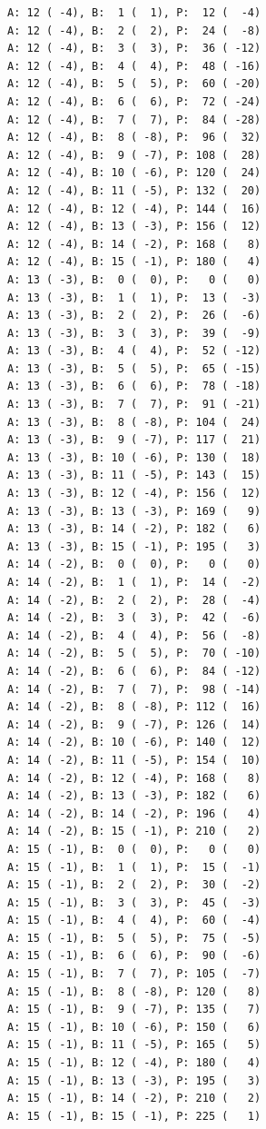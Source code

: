 \documentclass[12pt, titlepage]{report}
\begin{document}
\begin{framed}
\begin{verbatim}
A: 12 ( -4), B:  1 (  1), P:  12 (  -4)
A: 12 ( -4), B:  2 (  2), P:  24 (  -8)
A: 12 ( -4), B:  3 (  3), P:  36 ( -12)
A: 12 ( -4), B:  4 (  4), P:  48 ( -16)
A: 12 ( -4), B:  5 (  5), P:  60 ( -20)
A: 12 ( -4), B:  6 (  6), P:  72 ( -24)
A: 12 ( -4), B:  7 (  7), P:  84 ( -28)
A: 12 ( -4), B:  8 ( -8), P:  96 (  32)
A: 12 ( -4), B:  9 ( -7), P: 108 (  28)
A: 12 ( -4), B: 10 ( -6), P: 120 (  24)
A: 12 ( -4), B: 11 ( -5), P: 132 (  20)
A: 12 ( -4), B: 12 ( -4), P: 144 (  16)
A: 12 ( -4), B: 13 ( -3), P: 156 (  12)
A: 12 ( -4), B: 14 ( -2), P: 168 (   8)
A: 12 ( -4), B: 15 ( -1), P: 180 (   4)
A: 13 ( -3), B:  0 (  0), P:   0 (   0)
A: 13 ( -3), B:  1 (  1), P:  13 (  -3)
A: 13 ( -3), B:  2 (  2), P:  26 (  -6)
A: 13 ( -3), B:  3 (  3), P:  39 (  -9)
A: 13 ( -3), B:  4 (  4), P:  52 ( -12)
A: 13 ( -3), B:  5 (  5), P:  65 ( -15)
A: 13 ( -3), B:  6 (  6), P:  78 ( -18)
A: 13 ( -3), B:  7 (  7), P:  91 ( -21)
A: 13 ( -3), B:  8 ( -8), P: 104 (  24)
A: 13 ( -3), B:  9 ( -7), P: 117 (  21)
A: 13 ( -3), B: 10 ( -6), P: 130 (  18)
A: 13 ( -3), B: 11 ( -5), P: 143 (  15)
A: 13 ( -3), B: 12 ( -4), P: 156 (  12)
A: 13 ( -3), B: 13 ( -3), P: 169 (   9)
A: 13 ( -3), B: 14 ( -2), P: 182 (   6)
A: 13 ( -3), B: 15 ( -1), P: 195 (   3)
A: 14 ( -2), B:  0 (  0), P:   0 (   0)
A: 14 ( -2), B:  1 (  1), P:  14 (  -2)
A: 14 ( -2), B:  2 (  2), P:  28 (  -4)
A: 14 ( -2), B:  3 (  3), P:  42 (  -6)
A: 14 ( -2), B:  4 (  4), P:  56 (  -8)
A: 14 ( -2), B:  5 (  5), P:  70 ( -10)
A: 14 ( -2), B:  6 (  6), P:  84 ( -12)
A: 14 ( -2), B:  7 (  7), P:  98 ( -14)
A: 14 ( -2), B:  8 ( -8), P: 112 (  16)
A: 14 ( -2), B:  9 ( -7), P: 126 (  14)
A: 14 ( -2), B: 10 ( -6), P: 140 (  12)
A: 14 ( -2), B: 11 ( -5), P: 154 (  10)
A: 14 ( -2), B: 12 ( -4), P: 168 (   8)
A: 14 ( -2), B: 13 ( -3), P: 182 (   6)
A: 14 ( -2), B: 14 ( -2), P: 196 (   4)
A: 14 ( -2), B: 15 ( -1), P: 210 (   2)
A: 15 ( -1), B:  0 (  0), P:   0 (   0)
A: 15 ( -1), B:  1 (  1), P:  15 (  -1)
A: 15 ( -1), B:  2 (  2), P:  30 (  -2)
A: 15 ( -1), B:  3 (  3), P:  45 (  -3)
A: 15 ( -1), B:  4 (  4), P:  60 (  -4)
A: 15 ( -1), B:  5 (  5), P:  75 (  -5)
A: 15 ( -1), B:  6 (  6), P:  90 (  -6)
A: 15 ( -1), B:  7 (  7), P: 105 (  -7)
A: 15 ( -1), B:  8 ( -8), P: 120 (   8)
A: 15 ( -1), B:  9 ( -7), P: 135 (   7)
A: 15 ( -1), B: 10 ( -6), P: 150 (   6)
A: 15 ( -1), B: 11 ( -5), P: 165 (   5)
A: 15 ( -1), B: 12 ( -4), P: 180 (   4)
A: 15 ( -1), B: 13 ( -3), P: 195 (   3)
A: 15 ( -1), B: 14 ( -2), P: 210 (   2)
A: 15 ( -1), B: 15 ( -1), P: 225 (   1)
\end{verbatim}
\end{framed}
\end{document}

